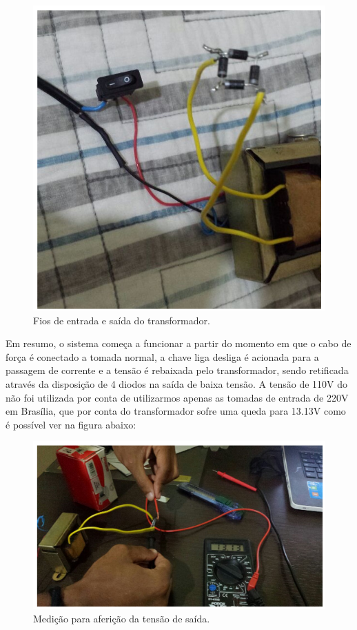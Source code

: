  \begin{figure}[H]
	\centering
	\includegraphics[scale=0.5]{figuras/fiosiotransformador}
	\caption{Fios de entrada e saída do transformador.}
	\label{img:fiosiotransformador}
\end{figure}

Em resumo, o sistema começa a funcionar a partir  do momento em que o cabo de força é conectado a tomada normal, a chave liga desliga é acionada para a passagem de corrente e a tensão é rebaixada pelo transformador, sendo retificada através da disposição de 4 diodos na saída de baixa tensão.
A tensão de 110V do não foi utilizada por conta de utilizarmos apenas as tomadas de entrada de 220V em Brasília, que por conta do transformador sofre uma queda para 13.13V como é possível ver na figura abaixo: 

 \begin{figure}[H]
	\centering
	\includegraphics[scale=0.5]{figuras/medicaoafericaotensao}
	\caption{Medição para aferição da tensão de saída.}
	\label{img:medicaoafericaotensao}
\end{figure}

